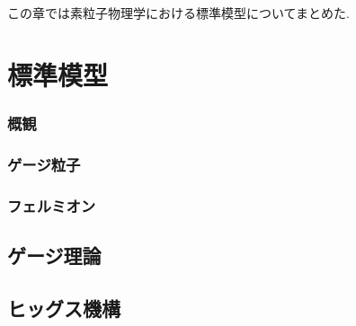 %
%
この章では素粒子物理学における標準模型についてまとめた.
\section{標準模型}
\subsubsection{概観}
\subsubsection{ゲージ粒子}
\subsubsection{フェルミオン}
\subsection{ゲージ理論}
\subsection{ヒッグス機構}


